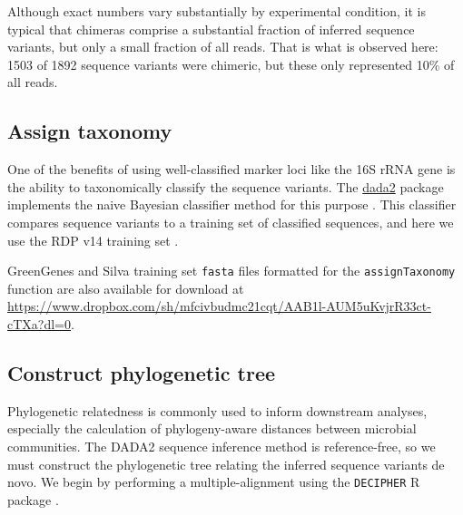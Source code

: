 Although exact numbers vary substantially by experimental condition, it is
typical that chimeras comprise a substantial fraction of inferred sequence variants,
but only a small fraction of all reads. That is
what is observed here: 1503 of 1892 sequence variants were chimeric, but
these only represented 10\% of all reads.

\subsection*{Assign taxonomy}

One of the benefits of using well-classified marker loci like the 16S
rRNA gene is the ability to taxonomically classify the sequence
variants. The \href{http://bioconductor.org/packages/dada2}{dada2}
package implements the naive Bayesian classifier method for this
purpose \cite{wang2007naive}. This classifier compares sequence
variants to a training set of classified sequences, and here we use the
RDP v14 training set \cite{cole2009rdp}.

\begin{knitrout}
\color{fgcolor}\begin{kframe}
\begin{alltt}
 \hlkwb{<-} 
 \hlkwb{<-}   
 \hlkwb{<-} \hlstd{(}\hlstd{,} \hlstd{,} \hlstd{,} \hlstd{,} \hlstd{,} \hlstd{)}
\end{alltt}
\end{kframe}
\end{knitrout}

GreenGenes and Silva training set {\tt fasta} files formatted for the
{\tt assignTaxonomy} function are also available for download at
\url{https://www.dropbox.com/sh/mfcivbudmc21cqt/AAB1l-AUM5uKvjrR33ct-cTXa?dl=0}.

\subsection*{Construct phylogenetic tree}
Phylogenetic relatedness is commonly used to inform downstream
analyses, especially the calculation of phylogeny-aware distances
between microbial communities. The DADA2 sequence inference method is
reference-free, so we must construct the phylogenetic tree relating
the inferred sequence variants de novo. We begin by performing a
multiple-alignment using the {\tt DECIPHER} R package
\cite{wright2015decipher}.

